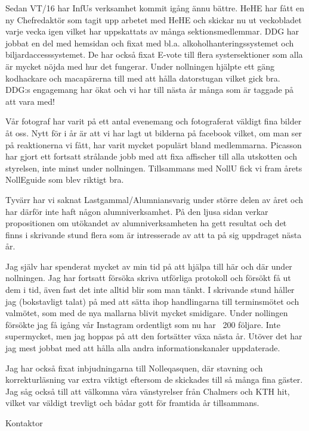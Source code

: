 \documentclass[../_main/handlingar.tex]{subfiles}
\begin{document}

Sedan VT/16 har InfUs verksamhet kommit igång ännu bättre. HeHE har fått en ny Chefredaktör som tagit upp arbetet med HeHE och skickar nu ut veckobladet varje vecka igen vilket har uppskattats av många sektionsmedlemmar. DDG har jobbat en del med hemsidan och fixat med bl.a. alkoholhanteringssystemet och biljardaccesssystemet. De har också fixat E-vote till flera systersektioner som alla är mycket nöjda med hur det fungerar. Under nollningen hjälpte ett gäng kodhackare och macapärerna till med att hålla datorstugan vilket gick bra. DDG:s engagemang har ökat och vi har till nästa år många som är taggade på att vara med!

Vår fotograf har varit på ett antal evenemang och fotograferat väldigt fina bilder åt oss. Nytt för i år är att vi har lagt ut bilderna på facebook vilket, om man ser på reaktionerna vi fått, har varit mycket populärt bland medlemmarna. Picasson har gjort ett fortsatt strålande jobb med att fixa affischer till alla utskotten och styrelsen, inte minst under nollningen. Tillsammans med NollU fick vi fram årets NollEguide som blev riktigt bra.

Tyvärr har vi saknat Lastgammal/Alumniansvarig under större delen av året och har därför inte haft någon alumniverksamhet. På den ljusa sidan verkar propositionen om utökandet av alumniverksamheten ha gett resultat och det finns i skrivande stund flera som är intresserade av att ta på sig uppdraget nästa år.

Jag själv har spenderat mycket av min tid på att hjälpa till här och där under nollningen. Jag har fortsatt försöka skriva utförliga protokoll och försökt få ut dem i tid, även fast det inte alltid blir som man tänkt. I skrivande stund håller jag (bokstavligt talat) på med att sätta ihop handlingarna till terminsmötet och valmötet, som med de nya mallarna blivit mycket smidigare. Under nollingen försökte jag få igång vår Instagram ordentligt som nu har ~200 följare. Inte supermycket, men jag hoppas på att den fortsätter växa nästa år. Utöver det har jag mest jobbat med att hålla alla andra informationskanaler uppdaterade.

Jag har också fixat inbjudningarna till Nolleqasquen, där stavning och korrekturläsning var extra viktigt eftersom de skickades till så många fina gäster. Jag såg också till att välkomna våra vänstyrelser från Chalmers och KTH hit, vilket var väldigt trevligt och bådar gott för framtida år tillsammans.

\begin{signatures}{1}
    \mvh
    \signature{\sekr}{Kontaktor}
\end{signatures}
\end{document}
